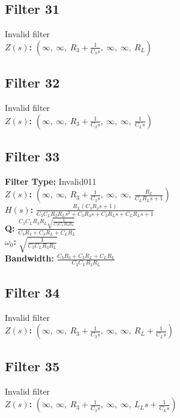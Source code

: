 \documentclass{article}
\begin{document}
\subsection*{Filter 31}
Invalid filter \\ 
\textbf{$Z(s)$:} $\left( \infty, \  \infty, \  R_{3} + \frac{1}{C_{3} s}, \  \infty, \  \infty, \  R_{L}\right)$ \\ 
\subsection*{Filter 32}
Invalid filter \\ 
\textbf{$Z(s)$:} $\left( \infty, \  \infty, \  R_{3} + \frac{1}{C_{3} s}, \  \infty, \  \infty, \  \frac{1}{C_{L} s}\right)$ \\ 
\subsection*{Filter 33}
\textbf{Filter Type:} Invalid011 \\ 
\textbf{$Z(s)$:} $\left( \infty, \  \infty, \  R_{3} + \frac{1}{C_{3} s}, \  \infty, \  \infty, \  \frac{R_{L}}{C_{L} R_{L} s + 1}\right)$ \\ 
\textbf{$H(s)$:} $\frac{R_{L} \left(C_{3} R_{3} s + 1\right)}{C_{3} C_{L} R_{3} R_{L} s^{2} + C_{3} R_{3} s + C_{3} R_{L} s + C_{L} R_{L} s + 1}$ \\ 
\textbf{Q:} $\frac{C_{3} C_{L} R_{3} R_{L} \sqrt{\frac{1}{C_{3} C_{L} R_{3} R_{L}}}}{C_{3} R_{3} + C_{3} R_{L} + C_{L} R_{L}}$ \\ 
\textbf{$\omega_0$:} $\sqrt{\frac{1}{C_{3} C_{L} R_{3} R_{L}}}$ \\ 
\textbf{Bandwidth:} $\frac{C_{3} R_{3} + C_{3} R_{L} + C_{L} R_{L}}{C_{3} C_{L} R_{3} R_{L}}$ \\ 
\subsection*{Filter 34}
Invalid filter \\ 
\textbf{$Z(s)$:} $\left( \infty, \  \infty, \  R_{3} + \frac{1}{C_{3} s}, \  \infty, \  \infty, \  R_{L} + \frac{1}{C_{L} s}\right)$ \\ 
\subsection*{Filter 35}
Invalid filter \\ 
\textbf{$Z(s)$:} $\left( \infty, \  \infty, \  R_{3} + \frac{1}{C_{3} s}, \  \infty, \  \infty, \  L_{L} s + \frac{1}{C_{L} s}\right)$ \\ 
\end{document}
